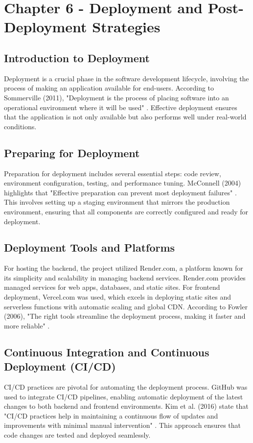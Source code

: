 \section{Chapter 6 - Deployment and Post-Deployment Strategies}

\subsection{Introduction to Deployment}
Deployment is a crucial phase in the software development lifecycle, involving the process of making an application available for end-users. According to Sommerville (2011), "Deployment is the process of placing software into an operational environment where it will be used" \cite{sommerville2011software}. Effective deployment ensures that the application is not only available but also performs well under real-world conditions.

\subsection{Preparing for Deployment}
Preparation for deployment includes several essential steps: code review, environment configuration, testing, and performance tuning. McConnell (2004) highlights that "Effective preparation can prevent most deployment failures" \cite{mcconnell2004code}. This involves setting up a staging environment that mirrors the production environment, ensuring that all components are correctly configured and ready for deployment.

\subsection{Deployment Tools and Platforms}
For hosting the backend, the project utilized Render.com, a platform known for its simplicity and scalability in managing backend services. Render.com provides managed services for web apps, databases, and static sites. For frontend deployment, Vercel.com was used, which excels in deploying static sites and serverless functions with automatic scaling and global CDN. According to Fowler (2006), "The right tools streamline the deployment process, making it faster and more reliable" \cite{fowler2006continuous}.

\subsection{Continuous Integration and Continuous Deployment (CI/CD)}
CI/CD practices are pivotal for automating the deployment process. GitHub was used to integrate CI/CD pipelines, enabling automatic deployment of the latest changes to both backend and frontend environments. Kim et al. (2016) state that "CI/CD practices help in maintaining a continuous flow of updates and improvements with minimal manual intervention" \cite{kim2016devops}. This approach ensures that code changes are tested and deployed seamlessly.

